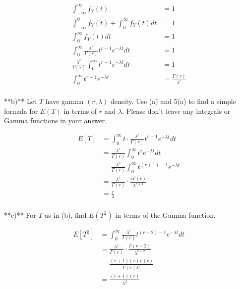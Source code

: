 \documentclass{report}
\begin{document}
\begin{align*}
	\int_{-\infty}^{\infty} f_{Y}(t) &= 1 \\
	\int_{-\infty }^{0} f_{Y}(t) + \int_{0}^{\infty } f_{Y}(t) dt &= 1 \\
	\int_{0}^{\infty }f_{Y}(t)dt &= 1 \\
	\int_{0}^{\infty } \frac{\lambda^{r}}{\Gamma(r)}t^{r-1}e^{-\lambda t}dt  &= 1 \\
	\frac{\lambda^{r}}{\Gamma(r)}\int_{0}^{\infty }t^{r-1}e^{-\lambda t}dt &= 1 \\
	\int_{0}^{\infty }t^{r-1}e^{-\lambda t} &= \frac{\Gamma(r)}{\lambda^{r}} \\
\end{align*}







**b)** Let $T$ have gamma $(r, \lambda)$ density. Use (a) and 5(a) to find a simple formula for $E(T)$ in terms of $r$ and $\lambda$. Please don't leave any integrals or Gamma functions in your answer.

\begin{align*}
	E[T] &= \int_{0}^{\infty } t \cdot \frac{\lambda ^{r}}{\Gamma(r)} t^{r-1}e^{-\lambda t} dt  \\
	&= \frac{\lambda^{r}}{\Gamma(r)}\int_{0}^{\infty } t^{r}e^{-\lambda t}dt \\
	&= \frac{\lambda^{r}}{\Gamma(r)} \int_{0}^{\infty } t^{(r+1) - 1} e^{-\lambda t} \\
	&= \frac{\lambda ^{r}}{\Gamma(r)} \cdot \frac{r\Gamma(r)}{\lambda ^{r+1}} \\
	&= \frac{r}{\lambda} \\
\end{align*}



**c)** For $T$ as in (b), find $E(T^2)$ in terms of the Gamma function. 

\begin{align*}
	E[T^{2}] &= \int_{0}^{\infty } \frac{\lambda^{r}}{\Gamma(r)} t^{(r+2) - 1} e^{-\lambda t}dt\\
		 &= \frac{\lambda^{r}}{\Gamma(r)} \cdot \frac{\Gamma(r+2)}{\lambda^{r+2}} \\
		 &= \frac{(r+1)(r)\Gamma(r)}{\Gamma(r)\lambda^{2}} \\
		 &= \frac{(r+1)(r)}{\lambda^{2}} \\
\end{align*}
\end{document}
